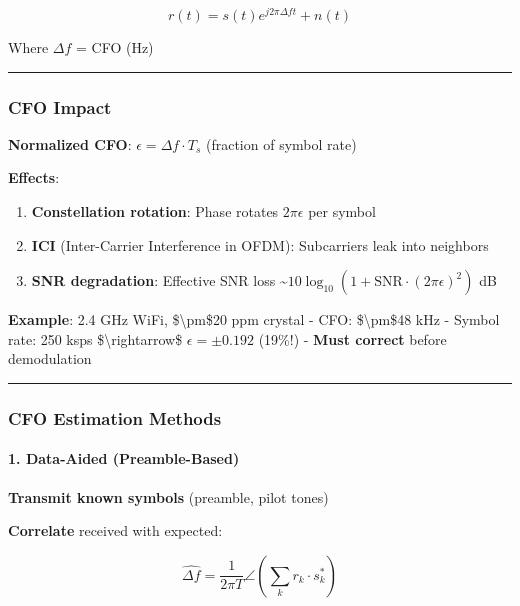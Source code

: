 \[
r(t) = s(t) e^{j 2\pi \Delta f t} + n(t)
\]

Where \(\Delta f\) = CFO (Hz)

\begin{center}\rule{0.5\linewidth}{0.5pt}\end{center}

\subsubsection{CFO Impact}\label{cfo-impact}

\textbf{Normalized CFO}: \(\epsilon = \Delta f \cdot T_s\) (fraction of
symbol rate)

\textbf{Effects}:

\begin{enumerate}
\def\labelenumi{\arabic{enumi}.}
\tightlist
\item
  \textbf{Constellation rotation}: Phase rotates \(2\pi \epsilon\) per
  symbol
\item
  \textbf{ICI} (Inter-Carrier Interference in OFDM): Subcarriers leak
  into neighbors
\item
  \textbf{SNR degradation}: Effective SNR loss
  \textasciitilde{}\(10 \log_{10}(1 + \text{SNR} \cdot (2\pi\epsilon)^2)\)
  dB
\end{enumerate}

\textbf{Example}: 2.4 GHz WiFi, \$\textbackslash pm\$20 ppm crystal -
CFO: \$\textbackslash pm\$48 kHz - Symbol rate: 250 ksps
\$\textbackslash rightarrow\$ \(\epsilon = \pm 0.192\) (19\%!) -
\textbf{Must correct} before demodulation

\begin{center}\rule{0.5\linewidth}{0.5pt}\end{center}

\subsubsection{CFO Estimation Methods}\label{cfo-estimation-methods}

\paragraph{1. Data-Aided
(Preamble-Based)}\label{data-aided-preamble-based}

\textbf{Transmit known symbols} (preamble, pilot tones)

\textbf{Correlate} received with expected:

\[
\hat{\Delta f} = \frac{1}{2\pi T} \angle \left(\sum_{k} r_k \cdot s_k^*\right)
\]

